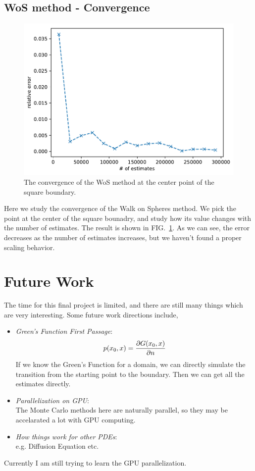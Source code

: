 \documentclass[aps, prl, preprint, groupedaddress]{revtex4-1}
\begin{document}
\subsection{WoS method - Convergence}

\begin{figure}[htbp]
    \centering
    \includegraphics[width=.8\textwidth]{./figs/err_es}
    \caption{\label{fig:err_es} The convergence of the WoS method at the center point of the square boundary.}
\end{figure}

Here we study the convergence of the Walk on Spheres method. We pick the point at the center of the square bounadry, and study how its value changes with the number of estimates. The result is shown in FIG.~\ref{fig:err_es}. As we can see, the error decreases as the number of estimates increases, but we haven't found a proper scaling behavior.

\section{Future Work}

The time for this final project is limited, and there are still many things which are very interesting. Some future work directions include,
\begin{itemize}
    \item \emph{Green's Function First Passage}:
    \begin{equation*}
        p(x_0, x) = \pdv{G(x_0, x)}{n}
    \end{equation*}
    If we know the Green's Function for a domain, we can directly simulate the transition from the starting point to the boundary. Then we can get all the estimates directly.
    \item \emph{Parallelization on GPU}:\\
    The Monte Carlo methods here are naturally parallel, so they may be accelarated a lot with GPU computing.
    \item \emph{How things work for other PDEs}:\\
    e.g. Diffusion Equation etc.
\end{itemize}
Currently I am still trying to learn the GPU parallelization.
\end{document}
